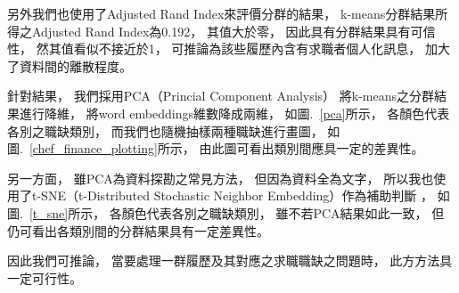 \documentclass[sigconf]{acmart}
\begin{document}
另外我們也使用了Adjusted Rand Index來評價分群的結果\cite{hubert1985comparing}，
k-means分群結果所得之Adjusted Rand Index為0.192，
其值大於零，
因此具有分群結果具有可信性，
然其值看似不接近於1，
可推論為該些履歷內含有求職者個人化訊息，
加大了資料間的離散程度。

針對結果，
我們採用PCA（Princial Component Analysis）\cite{pearson1901liii} \cite{han2011data}將k-means之分群結果進行降維，
將word embeddings維數降成兩維，
如圖.~\ref{pca}所示，
各顏色代表各別之職缺類別，
而我們也隨機抽樣兩種職缺進行畫圖，
如圖.~\ref{chef_finance_plotting}所示，
由此圖可看出類別間應具一定的差異性。


另一方面，
雖PCA為資料探勘之常見方法，
但因為資料全為文字，
所以我也使用了t-SNE（t-Distributed Stochastic Neighbor Embedding）\cite{van2008visualizing}作為補助判斷 ，
如圖.~\ref{t_sne}所示，
各顏色代表各別之職缺類別，
雖不若PCA結果如此一致，
但仍可看出各類別間的分群結果具有一定差異性。

因此我們可推論，
當要處理一群履歷及其對應之求職職缺之問題時，
此方方法具一定可行性。
\end{document}
